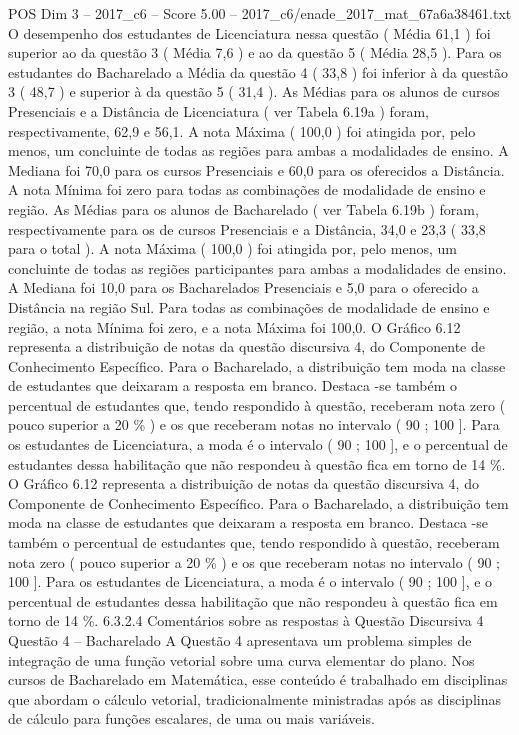 \begin{textsample}{POS Dim 3 – 2017\_c6 – Score 5.00 – 2017\_c6/enade\_2017\_mat\_67a6a38461.txt}
O desempenho dos estudantes de Licenciatura nessa questão ( Média 61,1 ) foi superior ao da questão 3 ( Média 7,6 ) e ao da questão 5 ( Média 28,5 ).
Para os estudantes do Bacharelado a Média da questão 4 ( 33,8 ) foi inferior à da questão 3 ( 48,7 ) e superior à da questão 5 ( 31,4 ).
As Médias para os alunos de cursos Presenciais e a Distância de Licenciatura ( ver Tabela 6.19a ) foram, respectivamente, 62,9 e 56,1.
A nota Máxima ( 100,0 ) foi atingida por, pelo menos, um concluinte de todas as regiões para ambas a modalidades de ensino.
A Mediana foi 70,0 para os cursos Presenciais e 60,0 para os oferecidos a Distância.
A nota Mínima foi zero para todas as combinações de modalidade de ensino e região.
As Médias para os alunos de Bacharelado ( ver Tabela 6.19b ) foram, respectivamente para os de cursos Presenciais e a Distância, 34,0 e 23,3 ( 33,8 para o total ).
A nota Máxima ( 100,0 ) foi atingida por, pelo menos, um concluinte de todas as regiões participantes para ambas a modalidades de ensino.
A Mediana foi 10,0 para os Bacharelados Presenciais e 5,0 para o oferecido a Distância na região Sul.
Para todas as combinações de modalidade de ensino e região, a nota Mínima foi zero, e a nota Máxima foi 100,0.
O Gráfico 6.12 representa a distribuição de notas da questão discursiva 4, do Componente de Conhecimento Específico.
Para o Bacharelado, a distribuição tem moda na classe de estudantes que deixaram a resposta em branco.
Destaca -se também o percentual de estudantes que, tendo respondido à questão, receberam nota zero ( pouco superior a 20 \% ) e os que receberam notas no intervalo ( 90 ; 100 ].
Para os estudantes de Licenciatura, a moda é o intervalo ( 90 ; 100 ], e o percentual de estudantes dessa habilitação que não respondeu à questão fica em torno de 14 \%.
O Gráfico 6.12 representa a distribuição de notas da questão discursiva 4, do Componente de Conhecimento Específico.
Para o Bacharelado, a distribuição tem moda na classe de estudantes que deixaram a resposta em branco.
Destaca -se também o percentual de estudantes que, tendo respondido à questão, receberam nota zero ( pouco superior a 20 \% ) e os que receberam notas no intervalo ( 90 ; 100 ].
Para os estudantes de Licenciatura, a moda é o intervalo ( 90 ; 100 ], e o percentual de estudantes dessa habilitação que não respondeu à questão fica em torno de 14 \%. 6.3.2.4 Comentários sobre as respostas à Questão Discursiva 4 Questão 4 – Bacharelado A Questão 4 apresentava um problema simples de integração de uma função vetorial sobre uma curva elementar do plano.
Nos cursos de Bacharelado em Matemática, esse conteúdo é trabalhado em disciplinas que abordam o cálculo vetorial, tradicionalmente ministradas após as disciplinas de cálculo para funções escalares, de uma ou mais variáveis.

\end{textsample}
